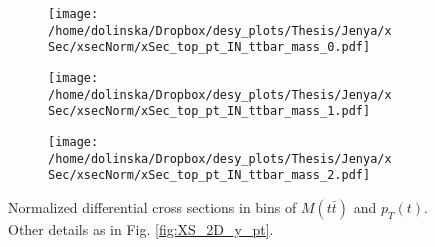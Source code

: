 \begin{figure}[H]
\centering
\begin{subfigure}
  \centering
  \texttt{[image: /home/dolinska/Dropbox/desy\_plots/Thesis/Jenya/xSec/xsecNorm/xSec\_top\_pt\_IN\_ttbar\_mass\_0.pdf]}
\end{subfigure}
\begin{subfigure}
  \centering
  \texttt{[image: /home/dolinska/Dropbox/desy\_plots/Thesis/Jenya/xSec/xsecNorm/xSec\_top\_pt\_IN\_ttbar\_mass\_1.pdf]}
\end{subfigure}
\begin{subfigure}
  \centering
  \texttt{[image: /home/dolinska/Dropbox/desy\_plots/Thesis/Jenya/xSec/xsecNorm/xSec\_top\_pt\_IN\_ttbar\_mass\_2.pdf]}
\end{subfigure}
\caption{Normalized differential cross sections in bins of $M(t\bar{t})$ and $p_{T}(t)$. Other details as in Fig. \ref{fig:XS_2D_y_pt}.}
\label{fig:XS_2D_Mtt_pt}
\end{figure}

